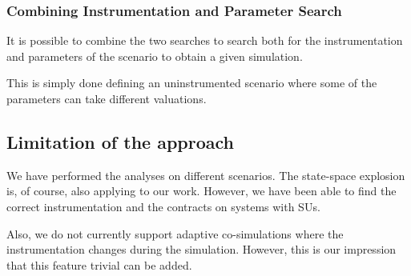 \subsubsection{Combining Instrumentation and Parameter Search}
It is possible to combine the two searches to search both for the instrumentation and parameters of the scenario to obtain a given simulation.

This is simply done defining an uninstrumented scenario where some of the parameters can take different valuations.


\subsection{Limitation of the approach}
We have performed the analyses on different scenarios. 
The state-space explosion is, of course, also applying to our work. 
However, we have been able to find the correct instrumentation and the contracts on systems with  SUs.

Also, we do not currently support adaptive co-simulations  where the instrumentation changes during the simulation. 
However, this is our impression that this feature trivial can be added.